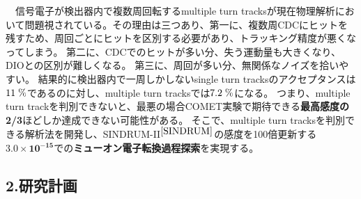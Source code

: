 \documentclass[11pt,a4j,dvipdfmx]{jarticle} 					%
\newcommand{\研究課題名}{ミューオン電子転換探索の感度向上に向けた解析手法の開発}
\newcommand{\研究機関名}{大阪大学}
\newcommand{\研究代表者氏名}{高見 翔太   }
\newcommand{\mysubsection}[1]{\vspace{-20pt}\subsection*{\colorbox{cyan!15}{\normalsize{#1}}}\vspace{-0.2cm}}
\begin{document}
　信号電子が検出器内で複数周回転するmultiple turn tracksが現在物理解析において問題視されている。その理由は三つあり、第一に、複数周CDCにヒットを残すため、周回ごとにヒットを区別する必要があり、トラッキング精度が悪くなってしまう。
第二に、CDCでのヒットが多い分、失う運動量も大きくなり、DIOとの区別が難しくなる。
第三に、周回が多い分、無関係なノイズを拾いやすい。
結果的に検出器内で一周しかしないsingle turn tracksのアクセプタンスは$11\;\rm{\%}$であるのに対し、multiple turn tracksでは$7.2\;\rm{\%}$になる。
つまり、multiple turn trackを判別できないと、最悪の場合COMET実験で期待できる\textbf{最高感度の2/3}ほどしか達成できない可能性がある。
そこで、multiple turn tracksを判別できる解析法を開発し、\mbox{SINDRUM-I\hspace{-1.2pt}I$^{\cite{SINDRUM}}$}の感度を100倍更新する$\mathbf{3.0 \times 10^{-15}}$での\textbf{ミューオン電子転換過程探索}を実現する。\\
\vspace{-0.5cm}
\mysubsection{2.研究計画}
\end{document}
